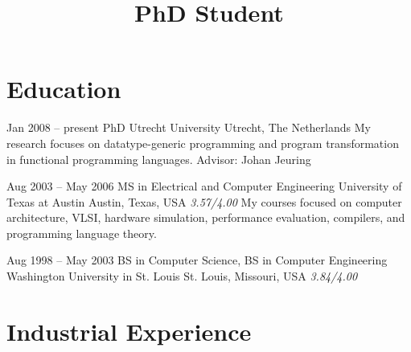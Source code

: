 \documentclass[11pt,a4paper,roman]{moderncv}
\title{PhD Student}
\begin{document}
\makecvtitle



\newcommand\seeabovedesc{(\textit{See description above.})}

\newcommand\utrecht{Utrecht, The Netherlands}
\newcommand\austin{Austin, Texas, USA}
\newcommand\stlouis{St. Louis, Missouri, USA}
\newcommand\chippewafalls{Chippewa Falls, Wisconsin, USA}
\newcommand\whitemarsh{White Marsh, Maryland, USA}
\newcommand\altamont{Altamont, Tennessee, USA}
\newcommand\chattanooga{Chattanooga, Tennessee, USA}
\newcommand\london{London, UK}
\newcommand\centurion{Centurion, South Africa}

\newcommand\uu{Utrecht University}
\newcommand\wustl{Washington University in St. Louis}
\newcommand\ut{University of Texas at Austin}



\newcommand\Cpp{C{}\texttt{++}\xspace}


\section{Education}

\cventry%
{Jan 2008 -- present}%
{PhD}%
{\uu}%
{\utrecht}%
{}%
{My research focuses on datatype-generic programming and program transformation
in functional programming languages.\newline{}%
Advisor: Johan Jeuring}

\cventry%
{Aug 2003 -- May 2006}%
{MS in Electrical and Computer Engineering}%
{University of Texas at Austin}%
{\austin}%
{\textit{3.57/4.00}}%
{My courses focused on computer architecture, VLSI, hardware simulation,
performance evaluation, compilers, and programming language theory.}

\cventry%
{Aug 1998 -- May 2003}%
{BS in Computer Science, BS in Computer Engineering}%
{\wustl}%
{\stlouis}%
{\textit{3.84/4.00}}%
{}


\section{Industrial Experience}
\end{document}
